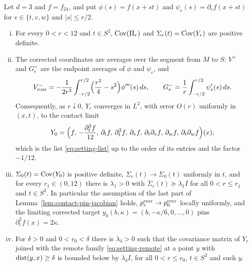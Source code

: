 \begin{lemma}\label{lem:contact-corrected}
Let $d=3$ and $f=f_{24}$, and put $\phi(s)=f(x+st)$ and $\psi_e(s)=\partial_ef(x+st)$ for $e\in\{t,v,w\}$ and $|s|\le r/2$.
\begin{enumerate}[(i)]
\item For every $0<r<12$ and $t\in S^2$, $\operatorname{Cov}(\Pi_r)$ and $\Sigma_r(t)=\operatorname{Cov}(Y_r)$ are positive definite.
\item The corrected coordinates are averages over the segment from $M$ to $S$: $V^+$ and $G^+_e$ are the endpoint averages of $\phi$ and $\psi_e$, and
\begin{equation}\label{eq:contact-segment}
V^-_{\rm corr}=-\frac1{2r^3}\int_{-r/2}^{r/2}\Bigl(\frac{r^2}4-s^2\Bigr)\phi'''(s)\,ds,\qquad G^-_e=\frac1r\int_{-r/2}^{r/2}\psi_e'(s)\,ds .
\end{equation}
Consequently, as $r\downarrow0$, $Y_r$ converges in $L^2$, with error $O(r)$ uniformly in $(x,t)$, to the contact limit
\begin{equation}\label{eq:contact-limitframe}
Y_0=\Bigl(f,\,-\frac{\partial_t^3f}{12},\,\partial_tf,\,\partial_t^2f,\,\partial_vf,\,\partial_t\partial_vf,\,\partial_wf,\,\partial_t\partial_wf\Bigr)(x),
\end{equation}
which is the list \eqref{eq:setting-list} up to the order of its entries and the factor $-1/12$.
\item $\Sigma_0(t)=\operatorname{Cov}(Y_0)$ is positive definite, $\Sigma_r(t)\to\Sigma_0(t)$ uniformly in $t$, and for every $r_1\in(0,12)$ there is $\lambda_1>0$ with $\Sigma_r(t)\succeq\lambda_1I$ for all $0<r\le r_1$ and $t\in S^2$. In particular the assumption of the last part of Lemma~\ref{lem:contact-pin-jacobian} holds, $p^{\rm corr}_r\to p^{\rm corr}_0$ locally uniformly, and the limiting corrected target $y_0(b,\kappa)=(b,-\kappa/6,0,\dots,0)$ pins $\partial_t^3f(x)=2\kappa$.
\item For $\delta>0$ and $0<r_0<\delta$ there is $\lambda_\delta>0$ such that the covariance matrix of $Y_r$ joined with the remote family \eqref{eq:setting-remote} at a point $y$ with $\operatorname{dist}(y,x)\ge\delta$ is bounded below by $\lambda_\delta I$, for all $0<r\le r_0$, $t\in S^2$ and such $y$.
\end{enumerate}
\end{lemma}

